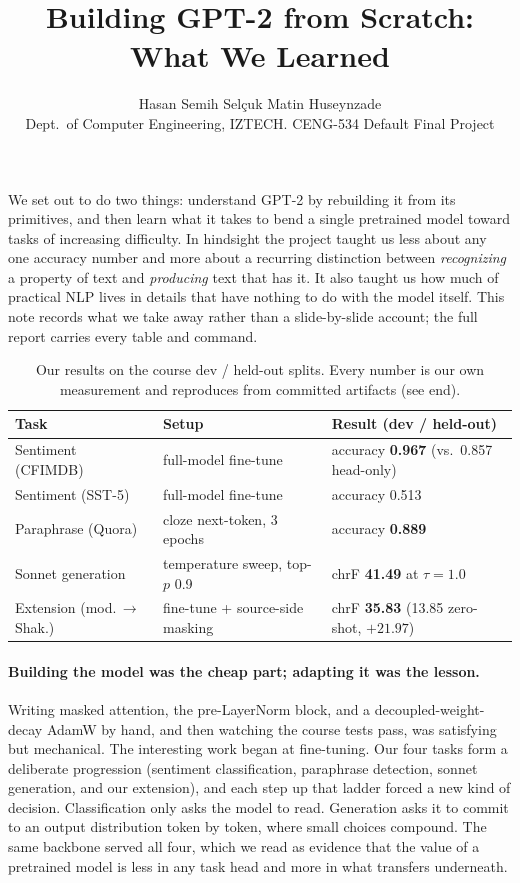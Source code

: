 \documentclass[11pt]{article}
\title{\vspace{-3em}Building GPT-2 from Scratch: What We Learned}
\author{Hasan Semih Sel\c{c}uk \quad Matin Huseynzade \\
  \small Dept.\ of Computer Engineering, IZTECH. CENG-534 Default Final Project}
\date{}
\begin{document}
\maketitle
\vspace{-1.5em}

We set out to do two things: understand GPT-2 by rebuilding it from its
primitives, and then learn what it takes to bend a single pretrained model toward
tasks of increasing difficulty. In hindsight the project taught us less about any
one accuracy number and more about a recurring distinction between
\emph{recognizing} a property of text and \emph{producing} text that has it. It
also taught us how much of practical NLP lives in details that have nothing to do
with the model itself. This note records what we take away rather than a
slide-by-slide account; the full report carries every table and command.

\begin{table}[h]
\centering
\small
\begin{tabular}{@{}lll@{}}
\toprule
\textbf{Task} & \textbf{Setup} & \textbf{Result (dev / held-out)} \\
\midrule
Sentiment (CFIMDB) & full-model fine-tune & accuracy \textbf{0.967} (vs.\ 0.857 head-only) \\
Sentiment (SST-5)  & full-model fine-tune & accuracy 0.513 \\
Paraphrase (Quora) & cloze next-token, 3 epochs & accuracy \textbf{0.889} \\
Sonnet generation  & temperature sweep, top-$p$ 0.9 & chrF \textbf{41.49} at $\tau=1.0$ \\
Extension (mod.\,$\rightarrow$\,Shak.) & fine-tune + source-side masking & chrF \textbf{35.83} (13.85 zero-shot, $+21.97$) \\
\bottomrule
\end{tabular}
\caption{Our results on the course dev / held-out splits. Every number is our own
measurement and reproduces from committed artifacts (see end).}
\end{table}

\paragraph{Building the model was the cheap part; adapting it was the lesson.}
Writing masked attention, the pre-LayerNorm block, and a decoupled-weight-decay
AdamW by hand, and then watching the course tests pass, was satisfying but
mechanical. The interesting work began at fine-tuning. Our four tasks form a
deliberate progression (sentiment classification, paraphrase detection, sonnet
generation, and our extension), and each step up that ladder forced a new kind of
decision. Classification only asks the model to read. Generation asks it to commit
to an output distribution token by token, where small choices compound. The same
backbone served all four, which we read as evidence that the value of a pretrained
model is less in any task head and more in what transfers underneath.
\end{document}
